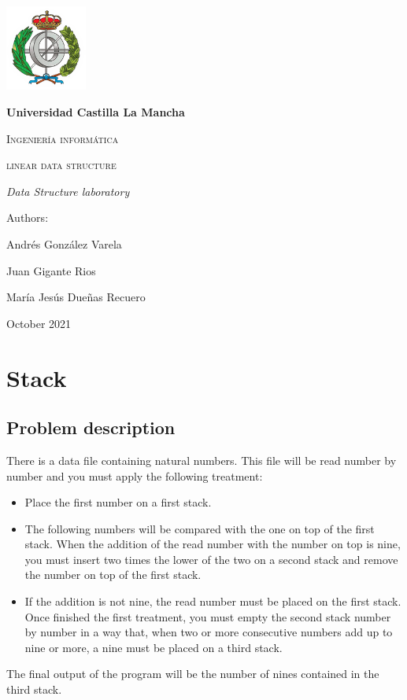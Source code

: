 \documentclass[a4paper]{article}
\theoremstyle{plain}
\theoremstyle{definition}
\begin{document}
    \begin{titlepage}
        \centering
        {\includegraphics[width=0.2\textwidth]{logo}\par}
        \vspace{1cm}
        {\bfseries\LARGE Universidad Castilla La Mancha \par}
        \vspace{1cm}
        {\scshape\Large Ingeniería informática \par}
        \vspace{3cm}
        {\scshape\Huge linear data structure \par}
        \vspace{3cm}
        {\itshape\Large Data Structure laboratory\par}
        \vfill
        {\Large Authors: \par}
        {\Large Andrés González Varela  \par Juan Gigante Rios\par  María Jesús Dueñas Recuero }
        \vfill
        {\Large October 2021 \par}
    \end{titlepage}
	

\newpage
	\tableofcontents
	\newpage
	\section{Stack}
        \subsection{Problem description}
        There is a data file containing natural numbers. This file will be read number by number and you must apply the following treatment:
        \begin{itemize}
            \item Place the first number on a first stack.
            \item The following numbers will be compared with the one on top of the first stack. When the addition of the read number with the number on top is nine, you must insert two times the lower of the two on a second stack and remove the number on top of the first stack.
            \item If the addition is not nine, the read number must be placed on the first stack. Once finished the first treatment, you must empty the second stack number by number in a way that, when two or more consecutive numbers add up to nine or more, a nine must be placed on a third stack.
        \end{itemize}
        The final output of the program will be the number of nines contained in the third stack.
\end{document}
